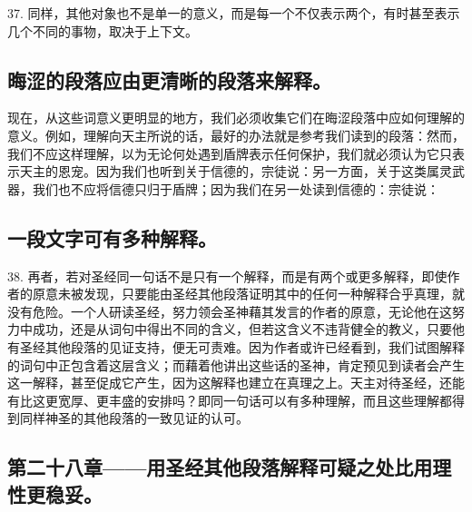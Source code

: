 37. 同样，其他对象也不是单一的意义，而是每一个不仅表示两个，有时甚至表示几个不同的事物，取决于上下文。\par


\subsection{晦涩的段落应由更清晰的段落来解释。}

现在，从这些词意义更明显的地方，我们必须收集它们在晦涩段落中应如何理解的意义。例如，理解向天主所说的话，最好的办法就是参考我们读到的段落：然而，我们不应这样理解，以为无论何处遇到盾牌表示任何保护，我们就必须认为它只表示天主的恩宠。因为我们也听到关于信德的，宗徒说：另一方面，关于这类属灵武器，我们也不应将信德只归于盾牌；因为我们在另一处读到信德的：宗徒说：\par


\subsection{一段文字可有多种解释。}

38. 再者，若对圣经同一句话不是只有一个解释，而是有两个或更多解释，即使作者的原意未被发现，只要能由圣经其他段落证明其中的任何一种解释合乎真理，就没有危险。一个人研读圣经，努力领会圣神藉其发言的作者的原意，无论他在这努力中成功，还是从词句中得出不同的含义，但若这含义不违背健全的教义，只要他有圣经其他段落的见证支持，便无可责难。因为作者或许已经看到，我们试图解释的词句中正包含着这层含义；而藉着他讲出这些话的圣神，肯定预见到读者会产生这一解释，甚至促成它产生，因为这解释也建立在真理之上。天主对待圣经，还能有比这更宽厚、更丰盛的安排吗？即同一句话可以有多种理解，而且这些理解都得到同样神圣的其他段落的一致见证的认可。\par


\subsection{第二十八章——用圣经其他段落解释可疑之处比用理性更稳妥。}

